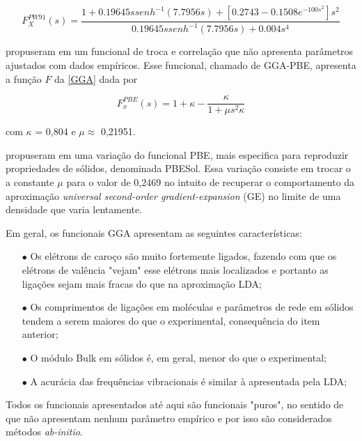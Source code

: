 			\begin{equation}
				F^{PW91}_X (s) = \frac{1 + 0.19645s senh^{-1}(7.7956s)+[0.2743 - 0.1508 e^{-100s^2}]s^2}{0.19645s senh^{-1}(7.7956s) + 0.004s^4}
			\end{equation}	
			
			\citeauthor{perdew1996generalized} propuseram em \citeyear{perdew1996generalized} um funcional de troca e correlação que não apresenta parâmetros ajustados com dados empíricos. Esse funcional, chamado de GGA-PBE, apresenta a função $F$ da \autoref{GGA} dada por
			
			\begin{equation}
				F_x^{PBE}(s) = 1 + \kappa - \frac{\kappa}{1 + \mu s^2 \kappa}
			\end{equation}
			
			com $\kappa$ = 0,804 e $\mu\approx$ 0,21951.
			
			\citeauthor{perdew2008restoring} propuseram em \citeyear{perdew2008restoring} uma variação do funcional PBE, mais especifica para reproduzir propriedades de sólidos, denominada PBESol. Essa variação consiste em trocar o a constante $\mu$ para o valor de 0,2469 no intuito de recuperar o comportamento da aproximação \textit{universal second-order gradient-expansion} (GE) no limite de uma densidade que varia lentamente. 
			
			Em geral, os funcionais GGA apresentam as seguintes características:
			
			\begin{enumerate}
				\item[$\bullet$] Os elétrons de caroço são muito fortemente ligados, fazendo com que os elétrons de valência "vejam" esse elétrons mais localizados e portanto as ligações sejam mais fracas do que na aproximação LDA;
				
				\item[$\bullet$] Os comprimentos de ligações em moléculas e parâmetros de rede em sólidos tendem a serem maiores do que o experimental, consequência do item anterior;
				
				\item[$\bullet$] O módulo Bulk em sólidos é, em geral, menor do que o experimental;
				
				\item[$\bullet$] A acurácia das frequências vibracionais é similar à apresentada pela LDA;
			\end{enumerate}
		
		Todos os funcionais apresentados até aqui são funcionais "puros", no sentido de que não apresentam nenhum parâmetro empírico e por isso são considerados métodos \textit{ab-initio}.
		
